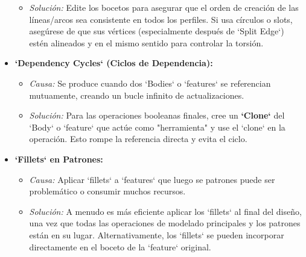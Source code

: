 \documentclass[12pt]{article}
\begin{document}
\begin{itemize}[label=\textbullet]
\begin{itemize}[label=\textendash]
        \item \textit{Solución:} Edite los bocetos para asegurar que el orden de creación de las líneas/arcos sea consistente en todos los perfiles. Si usa círculos o slots, asegúrese de que sus vértices (especialmente después de `Split Edge`) estén alineados y en el mismo sentido para controlar la torsión.
    \end{itemize}
    \item \textbf{`Dependency Cycles` (Ciclos de Dependencia):}
    \begin{itemize}[label=\textendash]
        \item \textit{Causa:} Se produce cuando dos `Bodies` o `features` se referencian mutuamente, creando un bucle infinito de actualizaciones.
        \item \textit{Solución:} Para las operaciones booleanas finales, cree un \textbf{`Clone`} del `Body` o `feature` que actúe como "herramienta" y use el `clone` en la operación. Esto rompe la referencia directa y evita el ciclo.
    \end{itemize}
    \item \textbf{`Fillets` en Patrones:}
    \begin{itemize}[label=\textendash]
        \item \textit{Causa:} Aplicar `fillets` a `features` que luego se patrones puede ser problemático o consumir muchos recursos.
        \item \textit{Solución:} A menudo es más eficiente aplicar los `fillets` al final del diseño, una vez que todas las operaciones de modelado principales y los patrones están en su lugar. Alternativamente, los `fillets` se pueden incorporar directamente en el boceto de la `feature` original.
    \end{itemize}
\end{itemize}
\end{document}

